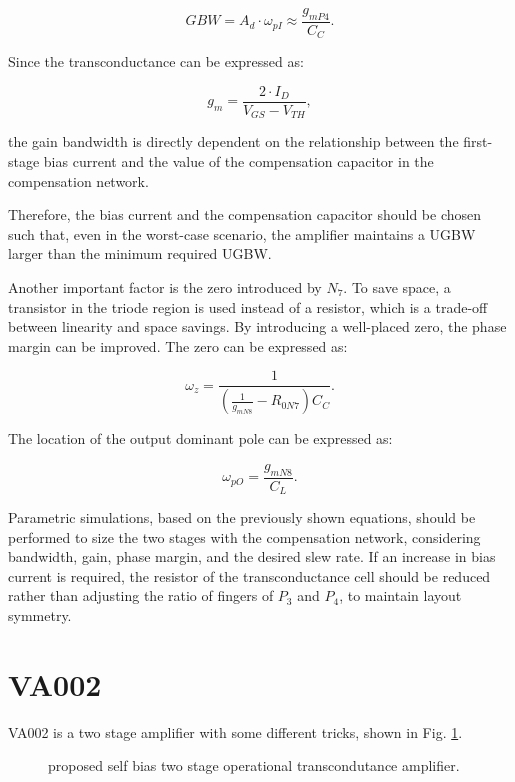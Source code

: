 \documentclass[12pt]{article}
\begin{document}
\begin{equation} GBW = A_d \cdot \omega_{pI} \approx \frac{g_{mP4}}{C_C}. \end{equation}

Since the transconductance can be expressed as:

\begin{equation} g_m = \frac{2 \cdot I_D}{V_{GS} - V_{TH}}, \end{equation}

the gain bandwidth is directly dependent on the relationship between the first-stage bias current and the value of the compensation capacitor in the compensation network. 

Therefore, the bias current and the compensation capacitor should be chosen such that, even in the worst-case scenario, the amplifier maintains a UGBW larger than the minimum required UGBW.

Another important factor is the zero introduced by $N_7$. To save space, a transistor in the triode region is used instead of a resistor, which is a trade-off between linearity and space savings. By introducing a well-placed zero, the phase margin can be improved. The zero can be expressed as:

\begin{equation} \omega_z = \frac{1}{\left(\frac{1}{g_{mN8}} - R_{0N7}\right)C_C}. \end{equation}

The location of the output dominant pole can be expressed as:

\begin{equation} \omega_{pO} = \frac{g_{mN8}}{C_L}. \end{equation}

Parametric simulations, based on the previously shown equations, should be performed to size the two stages with the compensation network, considering bandwidth, gain, phase margin, and the desired slew rate. If an increase in bias current is required, the resistor of the transconductance cell should be reduced rather than adjusting the ratio of fingers of $P_3$ and $P_4$, to maintain layout symmetry.



\section{VA002}
VA002 is a two stage amplifier with some different tricks, shown in Fig. \ref{VA002}.
\begin{figure}[H]
        \centering
        
        \caption{proposed self bias two stage operational transcondutance amplifier.}
        \label{VA002}
\end{figure}
\end{document}
